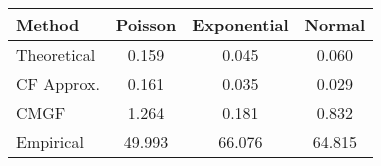 \begin{tabular}{lccc}
  \toprule
  \textbf{Method} & \textbf{Poisson} & \textbf{Exponential} & \textbf{Normal} \\\midrule
  Theoretical & 0.159 & 0.045 & 0.060 \\
  CF Approx.  & 0.161 & 0.035 & 0.029 \\
  CMGF        & 1.264 & 0.181 & 0.832 \\
  Empirical   & 49.993 & 66.076 & 64.815 \\\bottomrule
\end{tabular}